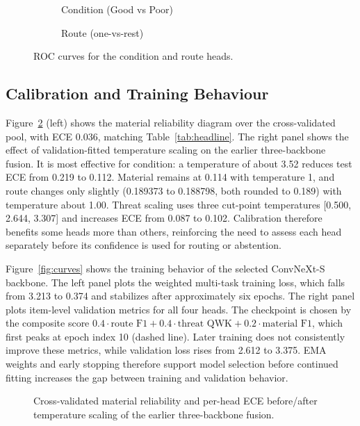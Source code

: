 \begin{figure}[!ht]
    \centering
    \begin{subfigure}{0.48\textwidth}\centering{}\caption{Condition (Good vs Poor)}\end{subfigure}\hfill
    \begin{subfigure}{0.48\textwidth}\centering{}\caption{Route (one-vs-rest)}\end{subfigure}
    \caption{ROC curves for the condition and route heads.}
    \label{fig:roc}
\end{figure}

\subsection{Calibration and Training Behaviour}
Figure~\ref{fig:calib} (left) shows the material reliability diagram over the cross-validated pool, with ECE 0.036, matching Table~\ref{tab:headline}. The right panel shows the effect of validation-fitted temperature scaling on the earlier three-backbone fusion. It is most effective for condition: a temperature of about 3.52 reduces test ECE from 0.219 to 0.112. Material remains at 0.114 with temperature 1, and route changes only slightly (0.189373 to 0.188798, both rounded to 0.189) with temperature about 1.00. Threat scaling uses three cut-point temperatures [0.500, 2.644, 3.307] and increases ECE from 0.087 to 0.102. Calibration therefore benefits some heads more than others, reinforcing the need to assess each head separately before its confidence is used for routing or abstention.

Figure~\ref{fig:curves} shows the training behavior of the selected ConvNeXt-S backbone. The left panel plots the weighted multi-task training loss, which falls from 3.213 to 0.374 and stabilizes after approximately six epochs. The right panel plots item-level validation metrics for all four heads. The checkpoint is chosen by the composite score $0.4 \cdot \text{route F1} + 0.4 \cdot \text{threat QWK} + 0.2 \cdot \text{material F1}$, which first peaks at epoch index 10 (dashed line). Later training does not consistently improve these metrics, while validation loss rises from 2.612 to 3.375. EMA weights and early stopping therefore support model selection before continued fitting increases the gap between training and validation behavior.

\begin{figure}[!ht]
    \centering
    \caption{Cross-validated material reliability and per-head ECE before/after temperature scaling of the earlier three-backbone fusion.}
    \label{fig:calib}
\end{figure}

